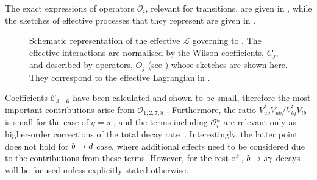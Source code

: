 The exact expressions of operators $\mathcal{O}_i$, relevant for \btosgamma transitions, are given in , while the sketches of effective processes that they represent are given in .
\begin{figure}[htbp!]
    
\caption{\label{fig:b_to_s_gamma_effective}
Schematic representation of the \SM effective $\mathcal{L}$ governing to \BtoXsgamma. 
The effective interactions are normalised by the Wilson coefficients, $C_j$, and described by operators, $O_j$ (see ) whose sketches are shown here.
They correspond to the effective Lagrangian in .
}
\end{figure}
Coefficients $\mathcal{C}_{3-6}$ have been calculated and shown to be small, therefore the most important contributions arise from $\mathcal{O}_{1,2,7,8}$ \cite{Chetyrkin:1996vx,Misiak:2020vlo}.
Furthermore, the ratio $V^*_{uq}V_{ub}/V^*_{tq}V_{tb}$ is small for the case of $q=s$ \cite{Charles:2015gya}, and the terms including $\mathcal{O}^u_i$ are relevant only as higher-order corrections of the total decay rate~\cite{Misiak:2015xwa}.
Interestingly, the latter point does not hold for $b\rightarrow d$ case, where additional effects need to be considered due to the contributions from these terms.
However, for the rest of , $b\rightarrow s\gamma$ decays will be focused unless explicitly stated otherwise.

